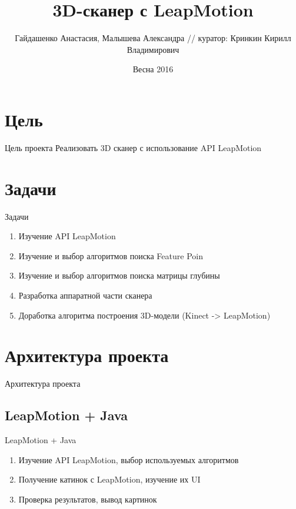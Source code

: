 \documentclass{beamer}
\title[3D сканер]{3D-сканер с LeapMotion}
\author{Гайдашенко Анастасия, Малышева Александра // куратор: Кринкин Кирилл Владимирович}
\institute{СПб АУ РАН}
\date{Весна 2016}
\newcommand{\cimg}[2]{%
	\begin{center}%
		\ifthenelse{\equal{#2}{}}{%
			\texttt{[image: \#1]}
		}{%
			\texttt{[image: \#1]}
		}%
	\end{center}%
}
\begin{document}
\begin{frame}
	\titlepage
\end{frame}

\section{Цель}

\begin{frame}[t]{Цель проекта}
	Реализовать 3D сканер с использование API LeapMotion
	
	\cimg{01.png}{0.45}

\end{frame}

\section{Задачи}
\begin{frame}[t]{Задачи}
	\begin{enumerate}
		\item Изучение API LeapMotion
		\item Изучение и выбор алгоритмов поиска Feature Poin
		\item Изучение и выбор алгоритмов поиска матрицы глубины
		\item Разработка аппаратной части сканера
		\item Доработка алгоритма построения 3D-модели (Kinect -> LeapMotion)
	\end{enumerate}
\end{frame}

\section{Архитектура проекта}
\begin{frame}[t]{Архитектура проекта}
	\cimg{02.png}{0.7}
\end{frame}

\subsection{LeapMotion + Java}
\begin{frame}[t]{LeapMotion + Java}
	\begin{enumerate}
		\item Изучение API LeapMotion, выбор используемых алгоритмов
		\item Получение катинок с LeapMotion, изучение их UI
		\item Проверка результатов, вывод картинок
	\end{enumerate}
\end{frame}
\end{document}
